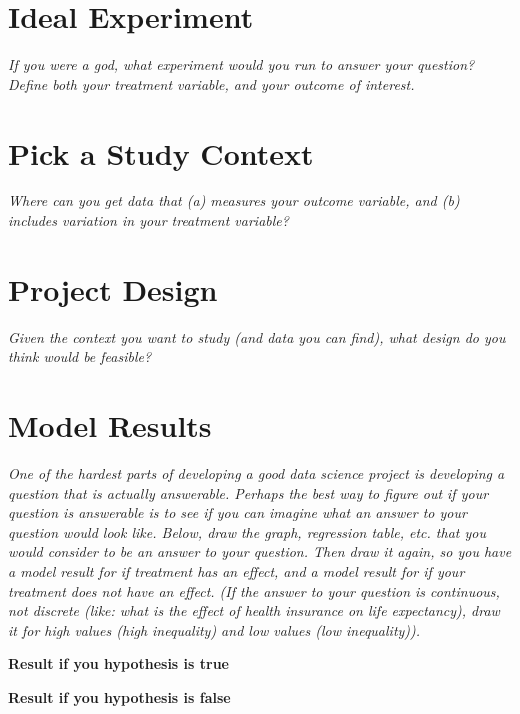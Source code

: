 \documentclass[12pt]{article}
\begin{document}
\section{Ideal Experiment}
\emph{If you were a god, what experiment would you run to answer your question? Define both your treatment variable, and your outcome of interest.}
\vspace*{1cm}\\

\section{Pick a Study Context}
\emph{Where can you get data that (a) measures your outcome variable, and (b) includes variation in your treatment variable?}
\vspace*{1cm}\\

\section{Project Design}
\emph{Given the context you want to study (and data you can find), what design do you think would be feasible?}
\vspace*{1cm}\\


\section{Model Results}
\emph{One of the hardest parts of developing a good data science project is developing a question that is actually answerable. Perhaps the best way to figure out if your question is answerable is to see if you can imagine what an answer to your question would look like. Below, draw the graph, regression table, etc. that you would consider to be an answer to your question. Then draw it again, so you have a model result for if treatment has an effect, and a model result for if  your treatment does not have an effect. (If the answer to your question is continuous, not discrete (like: what is the effect of health insurance on life expectancy), draw it for high values (high inequality) and low values (low inequality)).}

\begin{minipage}{0.5\textwidth}
\centering
\textbf{Result if you hypothesis is true}
\end{minipage}
\begin{minipage}{0.5\textwidth}
\centering
\textbf{Result if you hypothesis is false}
\end{minipage}
\vspace*{5cm}\\
\end{document}
